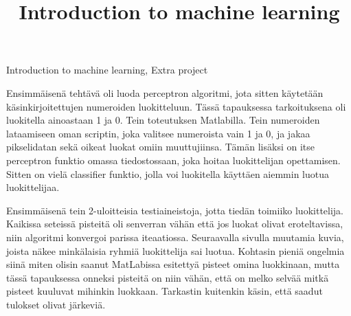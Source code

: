 \documentclass[a4paper,10pt]{article}
\title{Introduction to machine learning}
\author{}
\date{}
\begin{document}
\maketitle Introduction to machine learning, Extra project

Ensimmäisenä tehtävä oli luoda perceptron algoritmi, jota sitten käytetään käsinkirjoitettujen numeroiden luokitteluun. Tässä tapauksessa tarkoituksena
oli luokitella ainoastaan 1 ja 0. Tein toteutuksen Matlabilla. Tein numeroiden lataamiseen oman scriptin, joka valitsee numeroista vain 1 ja 0, 
ja jakaa pikselidatan sekä oikeat luokat omiin muuttujiinsa. Tämän lisäksi on itse perceptron funktio omassa tiedostossaan, joka hoitaa luokittelijan
opettamisen. Sitten on vielä classifier funktio, jolla voi luokitella käyttäen aiemmin luotua luokittelijaa. 

Ensimmäisenä tein 2-uloitteisia testiaineistoja, jotta tiedän toimiiko luokittelija. Kaikissa seteissä pisteitä oli senverran vähän että jos 
luokat olivat eroteltavissa, niin algoritmi konvergoi parissa iteaatiossa. Seuraavalla sivulla muutamia kuvia, joista näkee minkälaisia 
ryhmiä luokittelija sai luotua. Kohtasin pieniä ongelmia siinä miten olisin saanut MatLabissa esitettyä pisteet omina luokkinaan, mutta 
tässä tapauksessa onneksi pisteitä on niin vähän, että on melko selvää mitkä pisteet kuuluvat mihinkin luokkaan. Tarkastin kuitenkin käsin, että 
saadut tulokset olivat järkeviä.
\end{document}

